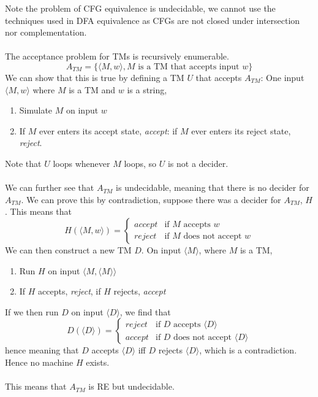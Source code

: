 \documentclass{article}
\newcommand{\encode}[1]{\langle #1 \rangle}
\begin{document}
    Note the problem of CFG equivalence is undecidable, we cannot use the techniques used in DFA equivalence as CFGs are not closed under intersection nor complementation. \\ \\
    The acceptance problem for TMs is recursively enumerable. 
    \[ A_{TM} = \{ \encode{M, w}, \text{$M$ is a TM that accepts input $w$} \} \]
    We can show that this is true by defining a TM $U$ that accepts $A_{TM}$: One input $\encode{M, w}$ where $M$ is a TM and $w$ is a string, 
    \begin{enumerate}
        \item Simulate $M$ on input $w$
        \item If $M$ ever enters its accept state, \textit{accept}: if $M$ ever enters its reject state, \textit{reject}. 
    \end{enumerate}
    Note that $U$ loops whenever $M$ loops, so $U$ is not a decider. \\ \\
    We can further see that $A_{TM}$ is undecidable, meaning that there is no decider for $A_{TM}$. We can prove this by contradiction, suppose there was a decider for $A_{TM}$, $H$. This means that
    \[ H(\encode{M,w}) = 
    \begin{cases}
        \textit{accept} & \text{if $M$ accepts $w$}\\
        \textit{reject} & \text{if $M$ does not accept $w$}
    \end{cases}
    \]
    We can then construct a new TM $D$. On input $\encode{M}$, where $M$ is a TM,
    \begin{enumerate}
        \item Run $H$ on input $\encode{M, \encode{M}}$
        \item If $H$ accepts, \textit{reject}, if $H$ rejects, \textit{accept}
    \end{enumerate}
    If we then run $D$ on input $\encode{D}$, we find that
    \[ D(\encode{D}) = 
    \begin{cases}
        \textit{reject} & \text{if $D$ accepts $\encode{D}$}\\
        \textit{accept} & \text{if $D$ does not accept $\encode{D}$}
    \end{cases}
    \]
    hence meaning that $D$ accepts $\encode{D}$ iff $D$ rejects $\encode{D}$, which is a contradiction. Hence no machine $H$ exists. \\ \\
    This means that $A_{TM}$ is RE but undecidable.
\end{document}
